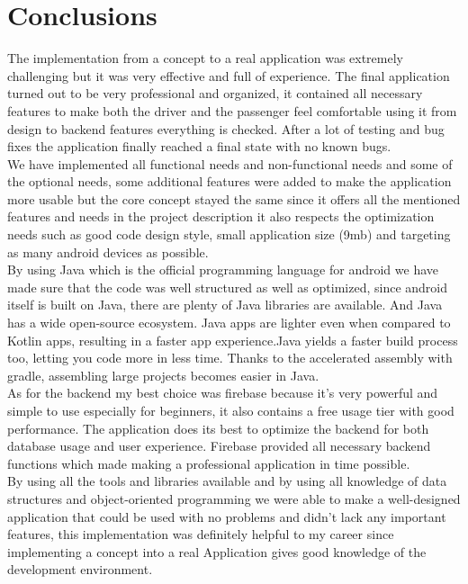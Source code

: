 \chapter{Conclusions}\label{chap:conclusions}

The implementation from a concept to a real application was extremely challenging but it was very effective and full of experience. The final application turned out to be very professional and organized, it contained all necessary features to make both the driver and the passenger feel comfortable using it from design to backend features everything is checked. After a lot of testing and bug fixes the application finally reached a final state with no known bugs.\\

We have implemented all functional needs and non-functional needs and some of the optional needs, some additional features were added to make the application more usable but the core concept stayed the same since it offers all the mentioned features and needs in the project description it also respects the optimization needs such as good code design style, small application size (9mb) and targeting as many android devices as possible.\\

By using Java which is the official programming language for android we have made sure that the code was well structured as well as optimized, since android itself is built on Java, there are plenty of Java libraries are available. And Java has a wide open-source ecosystem. Java apps are lighter even when compared to Kotlin apps, resulting in a faster app experience.Java yields a faster build process too, letting you code more in less time. Thanks to the accelerated assembly with gradle, assembling large projects becomes easier in Java.\\

As for the backend my best choice was firebase because it’s very powerful and simple to use especially for beginners, it also contains a free usage tier with good performance. The application does its best to optimize the backend for both database usage and user experience. Firebase provided all necessary backend functions which made making a professional application in time possible.\\
 
By using all the tools and libraries available and by using all knowledge of data structures and object-oriented programming we were able to make a well-designed application that could be used with no problems and didn’t lack any important features, this implementation was definitely helpful to my career since implementing a concept into a real Application gives good knowledge of the development environment.

